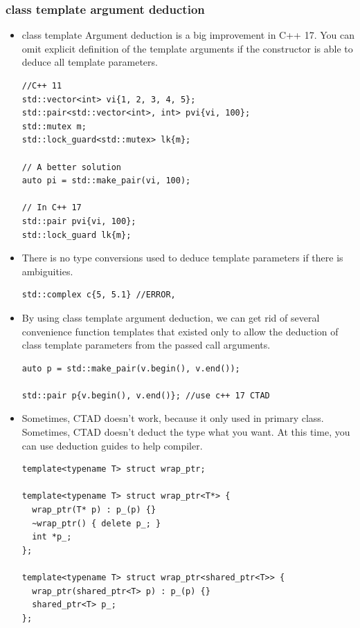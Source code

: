 \documentclass[a4paper,11pt,twoside]{book}
\begin{document}
\subsubsection{class template argument deduction}
\begin{itemize}

	\item class template Argument deduction is a big improvement in C++ 17. You can omit explicit definition of the template arguments if the constructor is able to deduce all template parameters. 

\begin{lstlisting}
//C++ 11
std::vector<int> vi{1, 2, 3, 4, 5};
std::pair<std::vector<int>, int> pvi{vi, 100};
std::mutex m;
std::lock_guard<std::mutex> lk{m};

// A better solution
auto pi = std::make_pair(vi, 100);

// In C++ 17
std::pair pvi{vi, 100};
std::lock_guard lk{m};
\end{lstlisting}

	\item There is no type conversions used to deduce template parameters if there is ambiguities. 
\begin{lstlisting}
std::complex c{5, 5.1} //ERROR, 
\end{lstlisting}

    \item By using class template argument deduction, we can get rid of several convenience function templates that existed only to allow the deduction of class template parameters from the passed call arguments. 
\begin{lstlisting}
auto p = std::make_pair(v.begin(), v.end());

std::pair p{v.begin(), v.end()}; //use c++ 17 CTAD
\end{lstlisting}

    \item Sometimes, CTAD doesn't work, because it only used in primary class. Sometimes, CTAD doesn't deduct the type what you want. At this time, you can use deduction guides to help compiler.
\begin{lstlisting}
template<typename T> struct wrap_ptr;

template<typename T> struct wrap_ptr<T*> {
  wrap_ptr(T* p) : p_(p) {}
  ~wrap_ptr() { delete p_; }
  int *p_;
};

template<typename T> struct wrap_ptr<shared_ptr<T>> {
  wrap_ptr(shared_ptr<T> p) : p_(p) {}
  shared_ptr<T> p_;
};


\end{lstlisting}
\end{itemize}
\end{document}
